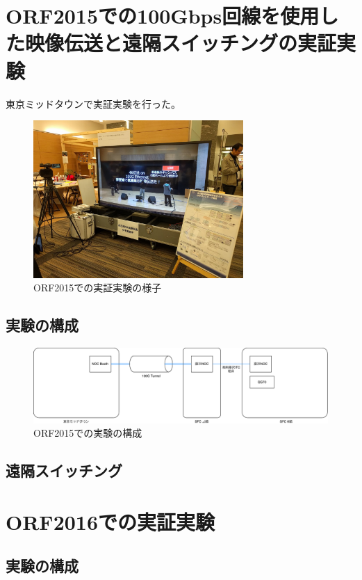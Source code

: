 \chapter{ORF2015での100Gbps回線を使用した映像伝送と遠隔スイッチングの実証実験}
\label{chap:orf2015}

東京ミッドタウンで実証実験を行った。
\begin{figure}[htbp]
  \begin{center}
    \includegraphics[bb=0 0 1200 900,width=8cm]{img/orf2015-IMG_20151121_132910.jpg}
  \end{center}
  \caption{ORF2015での実証実験の様子}
  \label{fig:orf2015-IMG_20151121_132910}
\end{figure}

\section{実験の構成}
\begin{figure}[htbp]
  \begin{center}
    \includegraphics[bb=0 0 1101 282,width=15.5cm]{img/orf2015-flow.pdf}
  \end{center}
  \caption{ORF2015での実験の構成}
  \label{fig:orf2015-flow}
\end{figure}

\section{遠隔スイッチング}

\chapter{ORF2016での実証実験}
\label{chap:orf2016}
\section{実験の構成}
